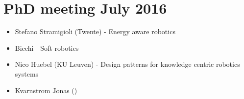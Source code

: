 \section{PhD meeting July 2016}


\begin{itemize}
\item Stefano Stramigioli (Twente) -  Energy aware robotics
\item Bicchi - Soft-robotics
\item Nico Huebel (KU Leuven) - Design patterns for knowledge centric robotics systems
\item Kvarnstrom Jonas ()
\end{itemize}
